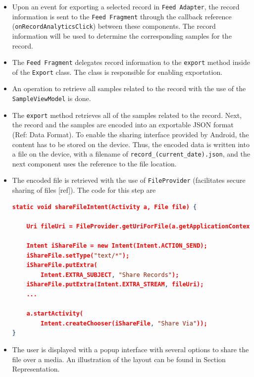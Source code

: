 \begin{itemize}
    \item[A.1] Upon an event for exporting a selected record in \verb|Feed Adapter|, the record information is sent to the \verb|Feed Fragment| through the callback reference (\verb|onRecordAnalyticsClick|) between these components. The record information will be used to determine the corresponding samples for the record.
    \item[A.2] The \verb|Feed Fragment| delegates record information to the \verb|export| method inside of the \verb|Export| class. The class is responsible for enabling exportation. 
    \item[A.3] An operation to retrieve all samples related to the record with the use of the \verb|SampleViewModel| is done. 
    \item[A.4] The \verb|export| method retrieves all of the samples related to the record. Next, the record and the samples are encoded into an exportable JSON format (Ref: Data Format). To enable the sharing interface provided by Android, the content has to be stored on the device. Thus, the encoded data is written into a file on the device, with a filename of \verb|record_(current_date).json|, and the next component uses the reference to the file location. 
    \item[A.5] The encoded file is retrieved with the use of \verb|FileProvider| (facilitates secure sharing of files [ref]). The code for this step are
\begin{lstlisting}[language=json, caption={My Caption}, captionpos=b]
static void shareFileIntent(Activity a, File file) {

    Uri fileUri = FileProvider.getUriForFile(a.getApplicationContext(), a.getApplicationContext().getPackageName() + ".provider", file);

    Intent iShareFile = new Intent(Intent.ACTION_SEND);
    iShareFile.setType("text/*");
    iShareFile.putExtra(
        Intent.EXTRA_SUBJECT, "Share Records");
    iShareFile.putExtra(Intent.EXTRA_STREAM, fileUri);
    ...

    a.startActivity(
        Intent.createChooser(iShareFile, "Share Via"));
}

\end{lstlisting}

    \item[A.6] The user is displayed with a popup interface with several options to share the file over a media. An illustration of the layout can be found in Section Representation. 


\end{itemize}


